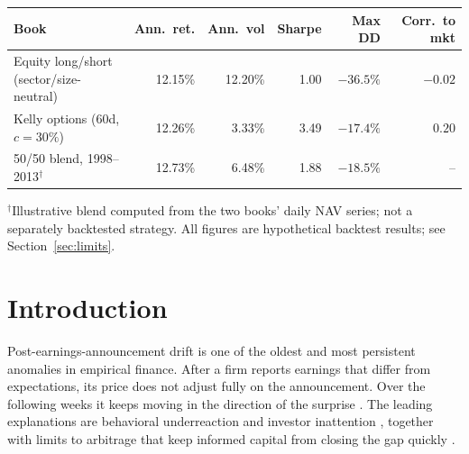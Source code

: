 \documentclass[11pt]{article}
\theoremstyle{definition}
\newcommand{\1}{\mathbf{1}}
\begin{document}
\begin{tcolorbox}[colback=navy!4,colframe=navy,title=\textbf{Key results (backtest, 1996--2013, \$10M initial capital, net of modeled costs)},fonttitle=\small,left=4pt,right=4pt,top=3pt,bottom=3pt]
\small
\begin{tabularx}{\linewidth}{@{}Xrrrrr@{}}
\toprule
Book & Ann.\ ret. & Ann.\ vol & Sharpe & Max DD & Corr.\ to mkt \\
\midrule
Equity long/short (sector/size-neutral) & 12.15\% & 12.20\% & 1.00 & $-36.5\%$ & $-0.02$ \\
Kelly options (60d, $c=30\%$) & 12.26\% & 3.33\% & 3.49 & $-17.4\%$ & $0.20$ \\
50/50 blend, 1998--2013$^\dagger$ & 12.73\% & 6.48\% & 1.88 & $-18.5\%$ & -- \\
\bottomrule
\end{tabularx}
\vspace{2pt}
{\footnotesize $^\dagger$Illustrative blend computed from the two books' daily NAV series; not a separately backtested strategy.
All figures are hypothetical backtest results; see Section~\ref{sec:limits}.}
\end{tcolorbox}

\tableofcontents
\newpage

\section{Introduction}

Post-earnings-announcement drift is one of the oldest and most persistent anomalies in
empirical finance. After a firm reports earnings that differ from expectations, its price
does not adjust fully on the announcement. Over the following weeks it keeps moving in the
direction of the surprise \citep{BallBrown1968,BernardThomas1989,BernardThomas1990}. The
leading explanations are behavioral underreaction and investor inattention
\citep{HirshleiferLimTeoh2009,DellaVignaPollet2009}, together with limits to arbitrage that
keep informed capital from closing the gap quickly
\citep{ShleiferVishny1997,Mendenhall2004}.
\end{document}
